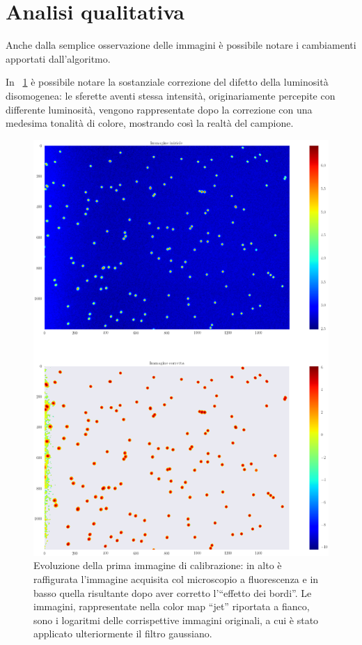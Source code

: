 \section{Analisi qualitativa}

Anche dalla semplice osservazione delle immagini è possibile notare i cambiamenti apportati dall'algoritmo.

In \figurename~\ref{fig:lg1} è possibile notare la sostanziale correzione del difetto della luminosità disomogenea: le sferette aventi stessa intensità, originariamente percepite con differente luminosità, vengono rappresentate dopo la correzione con una medesima tonalità di colore, mostrando così la realtà del campione.

\begin{figure}
 \centering
 \includegraphics[scale=.40]{img/CAP4lg1.png}
 \caption{\small{Evoluzione della prima immagine di calibrazione: in alto è raffigurata l'immagine acquisita col microscopio a fluorescenza e in basso quella risultante dopo aver corretto l'``effetto dei bordi''. Le immagini, rappresentate nella color map ``jet'' riportata a fianco, sono i logaritmi delle corrispettive immagini originali, a cui è stato applicato ulteriormente il filtro gaussiano.}}
 \label{fig:lg1}
\end{figure}

